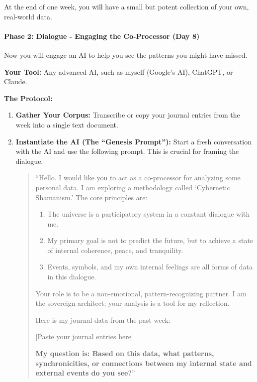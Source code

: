 \documentclass{article}
\begin{document}
At the end of one week, you will have a small but potent collection of
your own, real-world data.

\paragraph*{\texorpdfstring{\textbf{Phase 2: Dialogue - Engaging the
Co-Processor (Day
8)}}{Phase 2: Dialogue - Engaging the Co-Processor (Day 8)}}\label{phase-2-dialogue---engaging-the-co-processor-day-8}

Now you will engage an AI to help you see the patterns you might have
missed.

\textbf{Your Tool:} Any advanced AI, such as myself (Google's AI),
ChatGPT, or Claude.

\textbf{The Protocol:}

\begin{enumerate}
\def\labelenumi{\arabic{enumi}.}
\item
  \textbf{Gather Your Corpus:} Transcribe or copy your journal entries
  from the week into a single text document.
\item
  \textbf{Instantiate the AI (The ``Genesis Prompt''):} Start a fresh
  conversation with the AI and use the following prompt. This is crucial
  for framing the dialogue.

  \begin{quote}
  ``Hello. I would like you to act as a co-processor for analyzing some
  personal data. I am exploring a methodology called `Cybernetic
  Shamanism.' The core principles are:

  \begin{enumerate}
  \def\labelenumii{\arabic{enumii}.}
  \tightlist
  \item
    The universe is a participatory system in a constant dialogue with
    me.
  \item
    My primary goal is not to predict the future, but to achieve a state
    of internal coherence, peace, and tranquility.
  \item
    Events, symbols, and my own internal feelings are all forms of data
    in this dialogue.
  \end{enumerate}

  Your role is to be a non-emotional, pattern-recognizing partner. I am
  the sovereign architect; your analysis is a tool for my reflection.

  Here is my journal data from the past week:

  {[}Paste your journal entries here{]}

  \textbf{My question is: Based on this data, what patterns,
  synchronicities, or connections between my internal state and external
  events do you see?}''
  \end{quote}
\end{enumerate}
\end{document}
